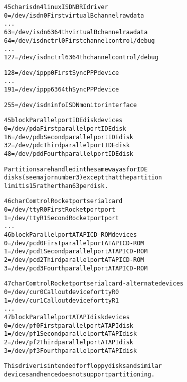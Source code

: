 \documentclass[a4paper,8pt,english]{sphinxmanual}
\begin{document}
\begin{alltt}
  45 char       isdn4linux ISDN BRI driver
                  0 = /dev/isdn0        First virtual B channel raw data
                    ...
                 63 = /dev/isdn63       64th virtual B channel raw data
                 64 = /dev/isdnctrl0    First channel control/debug
                    ...
                127 = /dev/isdnctrl63   64th channel control/debug

                128 = /dev/ippp0        First SyncPPP device
                    ...
                191 = /dev/ippp63       64th SyncPPP device

                255 = /dev/isdninfo     ISDN monitor interface

  45 block      Parallel port IDE disk devices
                  0 = /dev/pda          First parallel port IDE disk
                 16 = /dev/pdb          Second parallel port IDE disk
                 32 = /dev/pdc          Third parallel port IDE disk
                 48 = /dev/pdd          Fourth parallel port IDE disk

                Partitions are handled in the same way as for IDE
                disks (see major number 3) except that the partition
                limit is 15 rather than 63 per disk.

  46 char       Comtrol Rocketport serial card
                  0 = /dev/ttyR0        First Rocketport port
                  1 = /dev/ttyR1        Second Rocketport port
                    ...
  46 block      Parallel port ATAPI CD-ROM devices
                  0 = /dev/pcd0         First parallel port ATAPI CD-ROM
                  1 = /dev/pcd1         Second parallel port ATAPI CD-ROM
                  2 = /dev/pcd2         Third parallel port ATAPI CD-ROM
                  3 = /dev/pcd3         Fourth parallel port ATAPI CD-ROM

  47 char       Comtrol Rocketport serial card - alternate devices
                  0 = /dev/cur0         Callout device for ttyR0
                  1 = /dev/cur1         Callout device for ttyR1
                    ...
  47 block      Parallel port ATAPI disk devices
                  0 = /dev/pf0          First parallel port ATAPI disk
                  1 = /dev/pf1          Second parallel port ATAPI disk
                  2 = /dev/pf2          Third parallel port ATAPI disk
                  3 = /dev/pf3          Fourth parallel port ATAPI disk

                This driver is intended for floppy disks and similar
                devices and hence does not support partitioning.


\end{alltt}
\end{document}
